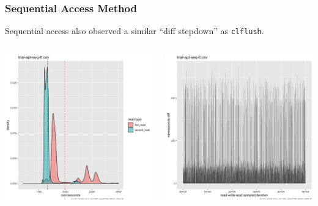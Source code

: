 \documentclass{beamer}
\begin{document}
\begin{frame}
 \frametitle{Sequential Access Method}
 Sequential access also observed a similar ``diff stepdown'' as \texttt{clflush}.
 \begin{columns}
  \begin{column}{0.5\textwidth}
   \includegraphics[width=\linewidth]{trial-apt-seq-0-histogram.png}

  \end{column}
  \begin{column}{0.5\textwidth}
   \includegraphics[width=\linewidth]{trial-apt-seq-0-barchart.png}

  \end{column}

 \end{columns}

\end{frame}
\end{document}
